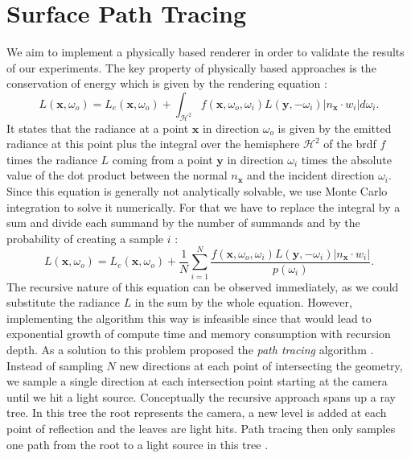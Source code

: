 \section{Surface Path Tracing}
We aim to implement a physically based renderer in order to validate the results of our experiments.
The key property of physically based approaches is the conservation of energy which is given by the rendering equation \cite{rendering_equation}:
\begin{equation}
    \label{eq:render_equation}
    L(\boldsymbol{x}, \omega_o) = L_e(\boldsymbol{x}, \omega_o) + \int_{\mathcal{H}^2} f(\boldsymbol{x}, \omega_o, \omega_i) L(\boldsymbol{y}, -\omega_i) |n_{\boldsymbol{x}} \cdot w_i| d\omega_i.
\end{equation}
It states that the radiance at a point $\boldsymbol{x}$ in direction $\omega_o$ is given by the emitted radiance at this point plus the integral over the hemisphere $\mathcal{H}^2$ of the \ac{brdf} $f$ times the radiance $L$ coming from a point $\boldsymbol{y}$ in direction $\omega_i$ times the absolute value of the dot product between the normal $n_{\boldsymbol{x}}$ and the incident direction $\omega_i$.
Since this equation is generally not analytically solvable, we use Monte Carlo integration to solve it numerically.
For that we have to replace the integral by a sum and divide each summand by the number of summands and by the probability of creating a sample $i$ \cite{pbr}:
\begin{equation*}
    L(\boldsymbol{x}, \omega_o) = L_e(\boldsymbol{x}, \omega_o) + \frac{1}{N}\sum_{i=1}^{N} \frac{f(\boldsymbol{x}, \omega_o, \omega_i) L(\boldsymbol{y}, -\omega_i) |n_{\boldsymbol{x}} \cdot w_i|}{p(\omega_i)}.
\end{equation*}
The recursive nature of this equation can be observed immediately, as we could substitute the radiance $L$ in the sum by the whole equation.
However, implementing the algorithm this way is infeasible since that would lead to exponential growth of compute time and memory consumption with recursion depth.
As a solution to this problem \citeauthor{rendering_equation} proposed the \textit{path tracing} algorithm \cite{rendering_equation}.
Instead of sampling $N$ new directions at each point of intersecting the geometry, we sample a single direction at each intersection point starting at the camera until we hit a light source.
Conceptually the recursive approach spans up a ray tree.
In this tree the root represents the camera, a new level is added at each point of reflection and the leaves are light hits.
Path tracing then only samples one path from the root to a light source in this tree \cite{rendering_equation}.
